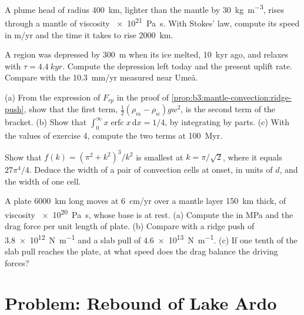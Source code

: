 \begin{exercise}[$\star\star$]\label{exo:b3:mantle-convection:8}
A plume head of radius \qty{400}{km}, lighter than the mantle by
\qty{30}{kg.m^{-3}}, rises through a mantle of viscosity \qty{e21}{Pa.s}. With
Stokes' law, compute its speed in \unit{m/yr} and the time it takes to rise
\qty{2000}{km}.
\end{exercise}

\begin{exercise}[$\star\star$]\label{exo:b3:mantle-convection:9}
A region was depressed by \qty{300}{m} when its ice melted, \qty{10}{kyr} ago,
and relaxes with $\tau = \qty{4.4}{kyr}$. Compute the depression left today and
the present uplift rate. Compare with the \qty{10.3}{mm/yr} measured near
Umeå.
\end{exercise}

\begin{exercise}[$\star\star\star$]\label{exo:b3:mantle-convection:10}
(a) From the expression of $F_{rp}$ in the proof of
\cref{prop:b3:mantle-convection:ridge-push}, show that the first term,
$\tfrac12(\rho_m - \rho_w)gw^2$, is the second term of the bracket. (b) Show that
$\int_0^\infty x\operatorname{erfc}x\,\mathrm dx = 1/4$, by integrating by parts.
(c) With the values of exercise 4, compute the two terms at \qty{100}{Myr}.
\end{exercise}

\begin{exercise}[$\star\star\star$]\label{exo:b3:mantle-convection:11}
Show that $f(k) = (\pi^2 + k^2)^3/k^2$ is smallest at $k = \pi/\sqrt2$, where
it equals $27\pi^4/4$. Deduce the width of a pair of convection cells at onset,
in units of $d$, and the width of one cell.
\end{exercise}

\begin{exercise}[$\star\star\star$]\label{exo:b3:mantle-convection:12}
A plate \qty{6000}{km} long moves at \qty{6}{cm/yr} over a mantle layer
\qty{150}{km} thick, of viscosity \qty{e20}{Pa.s}, whose base is at rest. (a)
Compute the  in \unit{MPa} and the drag force per unit length of plate.
(b) Compare with a ridge push of \qty{3.8e12}{N.m^{-1}} and a slab pull of
\qty{4.6e13}{N.m^{-1}}. (c) If one tenth of the slab pull reaches the plate,
at what speed does the drag balance the driving forces?
\end{exercise}

\section{Problem: Rebound of Lake Ardo}

